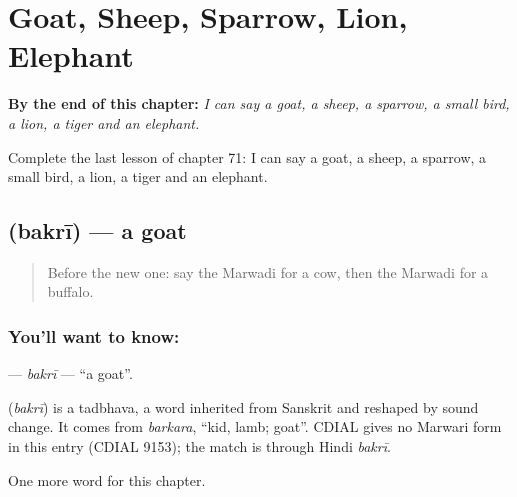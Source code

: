 
\chapter{Goat, Sheep, Sparrow, Lion, Elephant}
\label{ch:mw-goat-sheep-sparrow-lion-elephant}

\begin{chapteropening}
\textbf{By the end of this chapter:} \emph{I can say a goat, a sheep, a sparrow, a small bird, a lion, a tiger and an elephant.}

Complete the last lesson of chapter 71: I can say a goat, a sheep, a sparrow, a small bird, a lion, a tiger and an elephant.
\end{chapteropening}

\section[\texorpdfstring{\mw{बकरी} (bakrī)}{बकरी (bakrī)}]{ (bakrī) — a goat}

\label{lesson:MW-C71-bakri}



\begin{quote}
Before the new one: say the Marwadi for a cow, then the Marwadi for a buffalo.
\end{quote}

\subsection*{You'll want to know: }
\textbf{} — \emph{bakrī} — \textquotedblleft{}a goat\textquotedblright{}.

\begin{cousinweb}
\textbf{} (\emph{bakrī}) is a tadbhava, a word inherited from Sanskrit and reshaped by sound change. It comes from \emph{barkara}, \textquotedblleft{}kid, lamb; goat\textquotedblright{}. CDIAL gives no Marwari form in this entry (CDIAL 9153); the match is through Hindi \emph{bakrī}.
\end{cousinweb}

\begin{grammarlens}[title={What you've built}]
One more word for this chapter.
\end{grammarlens}

